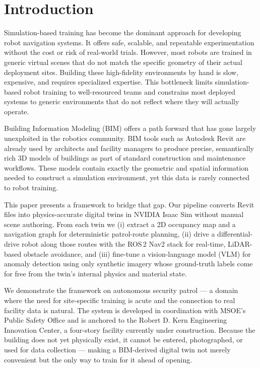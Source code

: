 \documentclass[10pt,twocolumn,letterpaper]{article}
\begin{document}
\section{Introduction}

Simulation-based training has become the dominant approach for developing robot
navigation systems. It offers safe, scalable, and repeatable experimentation
without the cost or risk of real-world trials. However, most robots are trained
in generic virtual scenes that do not match the specific geometry of their actual
deployment sites. Building these high-fidelity environments by hand is slow,
expensive, and requires specialized expertise. This bottleneck limits
simulation-based robot training to well-resourced teams and constrains most
deployed systems to generic environments that do not reflect where they will
actually operate.

Building Information Modeling (BIM) offers a path forward that has gone largely
unexploited in the robotics community. BIM tools such as Autodesk Revit are
already used by architects and facility managers to produce precise, semantically
rich 3D models of buildings as part of standard construction and maintenance
workflows. These models contain exactly the geometric and spatial information
needed to construct a simulation environment, yet this data is rarely connected
to robot training.

This paper presents a framework to bridge that gap. Our pipeline converts Revit
files into physics-accurate digital twins in NVIDIA Isaac Sim without manual
scene authoring. From each twin we (i) extract a 2D occupancy map and a
navigation graph for deterministic patrol-route planning, (ii) drive a
differential-drive robot along those routes with the ROS\,2 Nav2 stack for
real-time, LiDAR-based obstacle avoidance, and (iii) fine-tune a vision-language
model (VLM) for anomaly detection using only synthetic imagery whose ground-truth
labels come for free from the twin's internal physics and material state.

We demonstrate the framework on autonomous security patrol --- a domain where the
need for site-specific training is acute and the connection to real facility data
is natural. The system is developed in coordination with MSOE's Public Safety
Office and is anchored to the Robert D. Kern Engineering Innovation Center, a
four-story facility currently under construction. Because the building does not
yet physically exist, it cannot be entered, photographed, or used for data
collection --- making a BIM-derived digital twin not merely convenient but the
only way to train for it ahead of opening.
\end{document}

